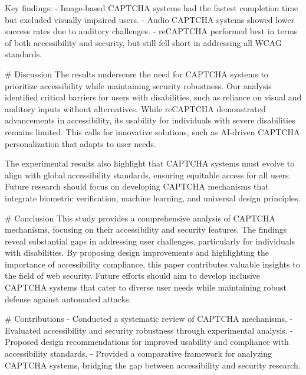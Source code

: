 Key findings:  
- Image-based CAPTCHA systems had the fastest completion time but excluded visually impaired users.  
- Audio CAPTCHA systems showed lower success rates due to auditory challenges.  
- reCAPTCHA performed best in terms of both accessibility and security, but still fell short in addressing all WCAG standards.

# Discussion  
The results underscore the need for CAPTCHA systems to prioritize accessibility while maintaining security robustness. Our analysis identified critical barriers for users with disabilities, such as reliance on visual and auditory inputs without alternatives. While reCAPTCHA demonstrated advancements in accessibility, its usability for individuals with severe disabilities remains limited. This calls for innovative solutions, such as AI-driven CAPTCHA personalization that adapts to user needs.

The experimental results also highlight that CAPTCHA systems must evolve to align with global accessibility standards, ensuring equitable access for all users. Future research should focus on developing CAPTCHA mechanisms that integrate biometric verification, machine learning, and universal design principles.

# Conclusion  
This study provides a comprehensive analysis of CAPTCHA mechanisms, focusing on their accessibility and security features. The findings reveal substantial gaps in addressing user challenges, particularly for individuals with disabilities. By proposing design improvements and highlighting the importance of accessibility compliance, this paper contributes valuable insights to the field of web security. Future efforts should aim to develop inclusive CAPTCHA systems that cater to diverse user needs while maintaining robust defense against automated attacks.

# Contributions  
- Conducted a systematic review of CAPTCHA mechanisms.  
- Evaluated accessibility and security robustness through experimental analysis.  
- Proposed design recommendations for improved usability and compliance with accessibility standards.  
- Provided a comparative framework for analyzing CAPTCHA systems, bridging the gap between accessibility and security research.

